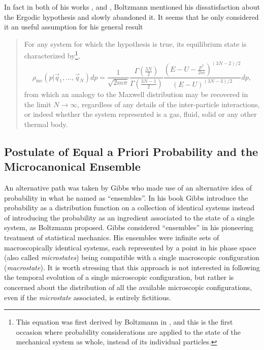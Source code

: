 \indent In fact in both of his works \cite{boltzmann_zur_1871}, and \cite{boltzmann_einige_1871}, Boltzmann mentioned his dissatisfaction about the Ergodic hypothesis and slowly abandoned it. It seems that he only considered it an useful assumption for his general result
\begin{quote}
For any system for which the hypothesis is true, its equilibrium state is characterized by\footnote{This equation was first derived by Boltzmann in \cite{boltzmann_uber_1866}, and this is the first occasion where probability considerations are applied to the state of the mechanical system as whole, instead of its individual particles.},
\begin{equation}
\rho_{\mathrm{mc}}\left(p | \vec{q}_{1}, \ldots, \vec{q}_{N}\right) d p=\frac{1}{\sqrt{2 m \pi}} \frac{\Gamma\left(\frac{3N}{2}\right)}{\Gamma\left(\frac{3N-1}{2}\right)} \frac{\left(E-U-\frac{p^{2}}{2 m}\right)^{(3N-2) / 2}}{(E-U)^{(3N-3) / 2}} d p,
\end{equation}
from which an analogy to the Maxwell distribution may be recovered in the limit $N \to \infty$, regardless of any details of the inter-particle interactions, or indeed whether the system represented is a gas, fluid, solid or any other thermal body.
\end{quote}

\subsection{Postulate of Equal a Priori Probability and the Microcanonical Ensemble}

An alternative path was taken by Gibbs who made use of an alternative idea of probability in what he named as ``ensembles''. In his book \cite{gibbs_elementary_1902} Gibbs introduce the probability as a distribution function on a collection of identical systems instead of introducing the probability as an ingredient associated to the state of a single system, as Boltzmann proposed. Gibbs considered ``ensembles'' in his pioneering treatment of statistical mechanics. His ensembles were infinite sets of macroscopically identical systems, each represented  by a point in his phase space (also called \textit{microstates}) being compatible with a single macroscopic configuration (\textit{macrostate}). It is worth stressing that this approach is not interested in following the temporal evolution of a single microscopic configuration, but rather is concerned about the distribution of all the available microscopic configurations, even if the \textit{microstate} associated, is entirely fictitious.\\

